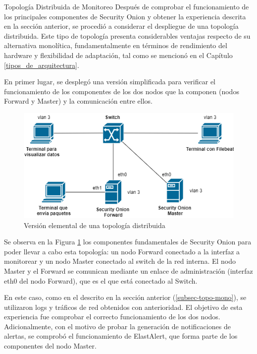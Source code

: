     \begin{subsection}{Topología Distribuida de Monitoreo}
    \label{sec_topo_dist}
    Después de comprobar el funcionamiento de los principales componentes de Security Onion y obtener la experiencia descrita en la sección anterior, se procedió a considerar el despliegue de una topología distribuida. Este tipo de topología presenta considerables ventajas respecto de su alternativa monolítica, fundamentalmente en términos de rendimiento del hardware y flexibilidad de adaptación, tal como se mencionó en el Capítulo  \ref{tipos_de_arquitectura}.\par
    En primer lugar, se desplegó una versión simplificada para verificar el funcionamiento de los componentes de los dos nodos que la componen (nodos Forward y Master) y la comunicación entre ellos.
    \begin{figure}[H]
    \centering
    \includegraphics[width=1\textwidth]{./iteracion_1_imagenes/figura_33_b_topologia_de_prueba_2.png}
    \caption{Versión elemental de una topología distribuida}
    \label{fig:topologia_distribuida_1}
    \end{figure}
    Se observa en la Figura \ref{fig:topologia_distribuida_1} los componentes fundamentales de Security Onion para poder llevar a cabo esta topología: un nodo Forward conectado a la interfaz a monitorear y un nodo Master conectado al switch de la red interna. El nodo Master y el Forward se comunican mediante un enlace de administración (interfaz eth0 del nodo Forward), que es el que está conectado al Switch. \par
    En este caso, como en el descrito en la sección anterior (\ref{subsec-topo-mono}), se utilizaron logs y tráficos de red obtenidos con anterioridad. El objetivo de esta experiencia fue comprobar el correcto funcionamiento de los dos nodos. Adicionalmente, con el motivo de probar la generación de notificaciones de alertas, se comprobó el funcionamiento de ElastAlert, que forma parte de los componentes del nodo Master. \par

\end{subsection}
